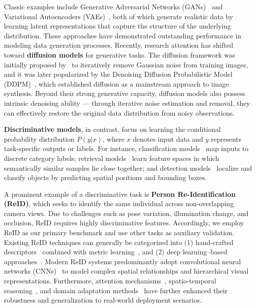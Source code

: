 \documentclass[conference]{IEEEtran}
\begin{document}
Classic examples include Generative Adversarial Networks (GANs)~\cite{goodfellow2014generative,mirza2014conditional,karras2019style} and Variational Autoencoders (VAEs)~\cite{kingma2013auto,van2017neural,zhao2017learning,xu2022socialvae}, both of which generate realistic data by learning latent representations that capture the structure of the underlying distribution. These approaches have demonstrated outstanding performance in modeling data generation processes.
Recently, research attention has shifted toward \textbf{diffusion models} for generative tasks.
The diffusion framework was initially proposed by~\cite{sohl2015deep} to iteratively remove Gaussian noise from training images, and it was later popularized by the Denoising Diffusion Probabilistic Model (DDPM)~\cite{ho2020denoising}, which established diffusion as a mainstream approach to image synthesis.
Beyond their strong generative capacity, diffusion models also possess intrinsic denoising ability — through iterative noise estimation and removal, they can effectively restore the original data distribution from noisy observations.

\textbf{Discriminative models}, in contrast, focus on learning the conditional probability distribution $P(y|x)$, where $x$ denotes input data and $y$ represents task-specific outputs or labels.
For instance, classification models~\cite{agarap2017architecture,albawi2017understanding,deng2012mnist} map inputs to discrete category labels; retrieval models~\cite{lin2015deep,weyand2020google} learn feature spaces in which semantically similar samples lie close together; and detection models~\cite{ren2015faster,law2018cornernet} localize and classify objects by predicting spatial positions and bounding boxes.

A prominent example of a discriminative task is \textbf{Person Re-Identification (ReID)}, which seeks to identify the same individual across non-overlapping camera views.
Due to challenges such as pose variation, illumination change, and occlusion, ReID requires highly discriminative features.
Accordingly, we employ ReID as our primary benchmark and use other tasks as auxiliary validation.
Existing ReID techniques can generally be categorized into (1) hand-crafted descriptors~\cite{liao2015person,ma2014covariance,yang2014salient} combined with metric learning~\cite{koestinger2012large,liao2015efficient,zheng2013reidentification}, and (2) deep learning–based approaches~\cite{wang2020high,wang2019color,wang2023self,ni2023part,fu2021unsupervised,cho2022part}.
Modern ReID systems predominantly adopt convolutional neural networks (CNNs)~\cite{lecun1998gradient} to model complex spatial relationships and hierarchical visual representations.
Furthermore, attention mechanisms~\cite{vaswani2017attention,dosovitskiy2020image}, spatio-temporal reasoning~\cite{li2020dyngcn,li2022autost}, and domain adaptation methods~\cite{chen2018domain} have further enhanced their robustness and generalization to real-world deployment scenarios.
\end{document}
